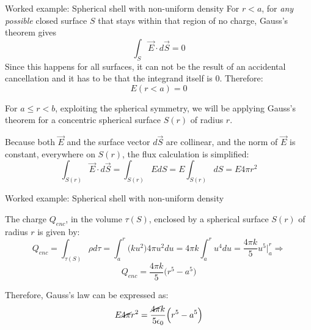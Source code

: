 {\begin{frame}{Worked example: Spherical shell with non-uniform density}
  For $r<a$, for {\em any possible} closed surface $S$
  that stays within that region of no charge, Gauss's theorem gives
  \begin{equation*}
    \int_{S} \vec{E} \cdot d\vec{S} = 0
  \end{equation*}
  Since this happens for all surfaces, it can not be the result of an
  accidental cancellation and it has to be that the integrand itself is 0.
  Therefore:
  \begin{equation}
    E (r<a) = 0
  \end{equation}

  \vspace{0.2cm}

  For $a \le r < b$, exploiting the spherical symmetry,
  we will be applying Gauss's theorem
  for a concentric spherical surface $S(r)$ of radius $r$.\\

  \vspace{0.2cm}

  Because both $\vec{E}$ and the surface vector $d\vec{S}$ are collinear,
  and the norm of $\vec{E}$ is constant, everywhere on $S(r)$,
  the flux calculation is simplified:
  \begin{equation*}
    \int_{S(r)} \vec{E} \cdot d\vec{S} =
    \int_{S(r)} E dS =
    E \int_{S(r)} dS =
    E 4\pi r^2
  \end{equation*}

\end{frame}

%
%
%

\begin{frame}{Worked example: Spherical shell with non-uniform density}

  The charge $Q_{enc}$, in the volume $\tau(S)$,
  enclosed by a spherical surface $S(r)$ of radius $r$
  is given by:
  \begin{equation*}
    Q_{enc} =
      \int_{\tau(S)} \rho d\tau =
      \int_{a}^{r} \Big( k u^2 \Big) 4\pi u^2 du =
      4\pi k \int_{a}^{r} u^4 du =
      \frac{4\pi k}{5} u^5 \Big\rvert_{a}^{r} \Rightarrow
  \end{equation*}
  \begin{equation*}
      Q_{enc} =
      \frac{4\pi k}{5} \Big(r^5 - a^5\Big)
  \end{equation*}

  Therefore, Gauss's law can be expressed as:
  \begin{equation*}
    E \cancel{4\pi} r^2 =
     \frac{\cancel{4\pi} k}{5 \epsilon_0} \Big(r^5 - a^5\Big)
  \end{equation*}


\end{frame}}
